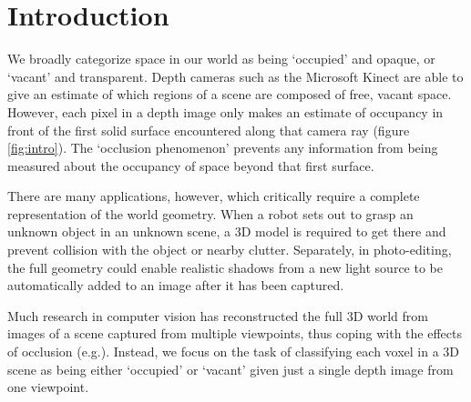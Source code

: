 \documentclass[10pt,twocolumn,letterpaper]{article}
\makeatletter
\renewcommand*{\eg}{e.g.\@\xspace}
\makeatother
\begin{document}
\section{Introduction}


We broadly categorize space in our world as being `occupied' and opaque, or `vacant' and transparent.
Depth cameras such as the Microsoft Kinect are able to give an estimate of which regions of a scene are composed of free, vacant space.
However, each pixel in a depth image only makes an estimate of occupancy in front of the first solid surface encountered along that camera ray (figure \ref{fig:intro}).
The `occlusion phenomenon' prevents any information from being measured about the occupancy of space beyond that first surface.

There are many applications, however, which critically require a complete representation of the world geometry.
When a robot sets out to grasp an unknown object in an unknown scene, a 3D model is required to get there and prevent collision with the object or nearby clutter.
Separately, in photo-editing, the full geometry could enable realistic shadows from a new light source to be automatically added to an image after it has been captured.

Much research in computer vision has reconstructed the full 3D world from images of a scene captured from multiple viewpoints, thus coping with the effects of occlusion  (\eg \cite{izadi-uist-2011}).
Instead, we focus on the task of classifying each voxel in a 3D scene as being either `occupied' or `vacant' given just a single depth image from one viewpoint.

\end{document}
